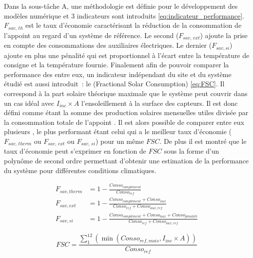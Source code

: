 Dans la sous-tâche A, une méthodologie est définie pour le développement des modèles
numérique et $3$ indicateurs sont introduits \eqref{eq:indicateur_performance}. $F_{sav,\,th}$ est le taux d’économie
caractérisant la réduction de la
consommation de l’appoint au regard d’un système de référence. Le second ($F_{sav,\,ext}$) ajoute
la prise en compte des consommations des auxiliaires électriques. Le dernier ($F_{sav, si}$) ajoute en
plus une pénalité qui est proportionnel à l’écart entre la température de consigne et la température
fournie.
Finalement afin de pouvoir comparer la performance des  entre eux, un indicateur
indépendant du site et du système étudié est aussi introduit~: le  (Fractional Solar Consumption) \eqref{eq:FSC}.
Il correspond à la part solaire théorique maximale que le système peut couvrir dans un cas idéal avec $I_{inc} \times A$
l’ensoleillement à la surface des capteurs. Il est donc défini comme étant la somme des production solaires mensuelles
utiles divisée par la consommation totale de l’appoint \parencite{Letz2009}. Il est alors possible
de comparer entre eux plusieurs , le plus performant étant celui qui a le meilleur taux d’économie
($F_{sav,\,therm}$ ou $F_{sav,\,ext}$ ou $F_{sav,\,si}$) pour un même $FSC$. De plus il est montré
que le taux d’économie peut s’exprimer en fonction de $FSC$ sous la forme d’un polynôme de second ordre
permettant d’obtenir une estimation de la performance du système pour différentes conditions climatiques.

\begin{subequations}\label{eq:indicateur_performance}
    \begin{align}
        F_{sav, therm} &= 1 - \frac{Conso_{complément}}{Conso_{ref}}                        \\
        F_{sav, ext}   &= 1 - \frac{Conso_{complément} + Conso_{aux}}{Conso_{ref} + Conso_{aux, ref}}  \\
        F_{sav, si}    &= 1 - \frac{Conso_{complément} + Conso_{aux} + Conso_{pénalité}}{Conso_{ref} + Conso_{aux, ref}}
    \end{align}
\end{subequations}

\begin{equation}\label{eq:FSC}
        FSC = \frac{\sum_{1}^{12} \left( \min(Conso_{ref, mois}, I_{inc} \times A) \right)}{Conso_{ref}}
\end{equation}

